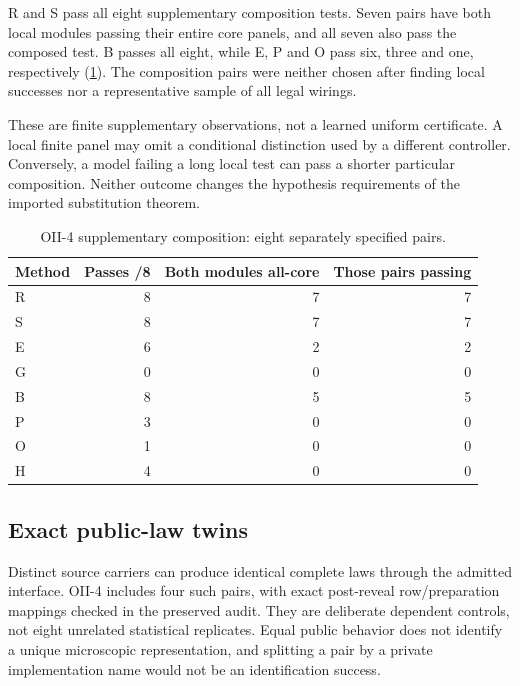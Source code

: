 R and S pass all eight supplementary composition tests. Seven pairs have both local modules passing their entire core panels, and all seven also pass the composed test. B passes all eight, while E, P and O pass six, three and one, respectively (\cref{tab:composition}). The composition pairs were neither chosen after finding local successes nor a representative sample of all legal wirings.

These are finite supplementary observations, not a learned uniform \RRC{} certificate. A local finite panel may omit a conditional distinction used by a different controller. Conversely, a model failing a long local test can pass a shorter particular composition. Neither outcome changes the hypothesis requirements of the imported substitution theorem.


\begin{table}[tbp]
\centering
\caption{OII-4 supplementary composition: eight separately specified pairs.}\label{tab:composition}
\small
\setlength{\tabcolsep}{5pt}
\begin{tabular}{lrrr}
\toprule
Method & Passes /8 & Both modules all-core & Those pairs passing \\
\midrule
R & 8 & 7 & 7 \\
S & 8 & 7 & 7 \\
E & 6 & 2 & 2 \\
G & 0 & 0 & 0 \\
B & 8 & 5 & 5 \\
P & 3 & 0 & 0 \\
O & 1 & 0 & 0 \\
H & 4 & 0 & 0 \\
\bottomrule
\end{tabular}
\end{table}



\subsection{Exact public-law twins}\label{p3:c17}
Distinct source carriers can produce identical complete laws through the admitted interface. OII-4 includes four such pairs, with exact post-reveal row/preparation mappings checked in the preserved audit. They are deliberate dependent controls, not eight unrelated statistical replicates. Equal public behavior does not identify a unique microscopic representation, and splitting a pair by a private implementation name would not be an identification success.

